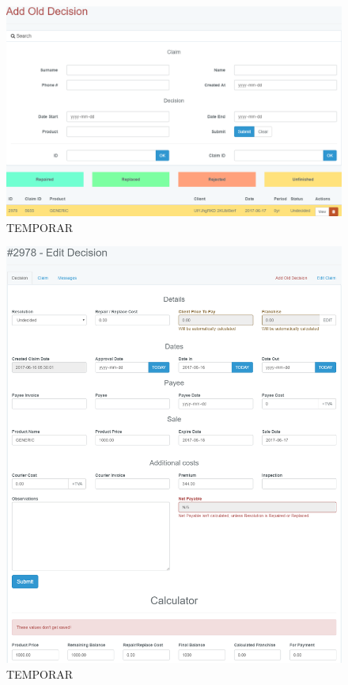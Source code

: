 	\begin{figure}
		\includegraphics[width=\linewidth]{../imagini/decisions_add_old.png}
		\caption{TEMPORAR}
		\label{fig:TEMP}
	\end{figure}
	\begin{figure}
		\includegraphics[width=\linewidth]{../imagini/decisions_edit.png}
		\caption{TEMPORAR}
		\label{fig:TEMP}
	\end{figure}
